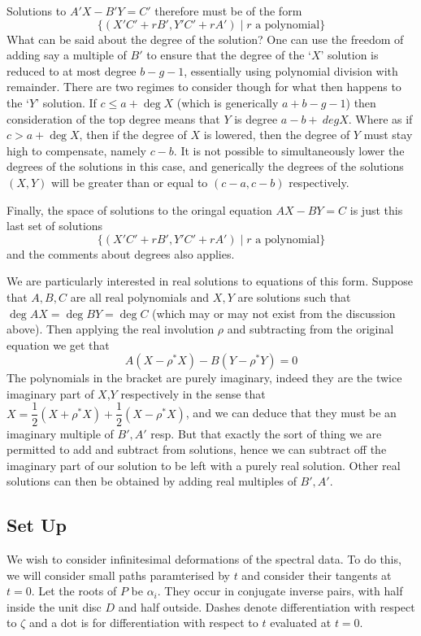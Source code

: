 Solutions to $A'X - B'Y = C'$ therefore must be of the form
\[
\{(X'C' + rB', Y'C' + rA') \mid r \text{ a polynomial} \}
\]
What can be said about the degree of the solution? One can use the freedom of adding say a multiple of $B'$ to ensure that the degree of the `$X$' solution is reduced to at most degree $b-g-1$, essentially using polynomial division with remainder. There are two regimes to consider though for what then happens to the `$Y$' solution. If $c \leq a + \deg X$ (which is generically $a+b-g-1$) then consideration of the top degree means that $Y$ is degree $a-b +\ deg X$. Where as if $c > a + \deg X$, then if the degree of $X$ is lowered, then the degree of $Y$ must stay high to compensate, namely $c-b$. It is not possible to simultaneously lower the degrees of the solutions in this case, and generically the degrees of the solutions $(X,Y)$ will be greater than or equal to $(c-a,c-b)$ respectively.

Finally, the space of solutions to the oringal equation $AX-BY=C$ is just this last set of solutions
\[
\{(X'C' + rB', Y'C' + rA') \mid r \text{ a polynomial} \}
\]
and the comments about degrees also applies.

We are particularly interested in real solutions to equations of this form. Suppose that $A,B,C$ are all real polynomials and $X,Y$ are solutions such that $\deg AX = \deg BY = \deg C$ (which may or may not exist from the discussion above). Then applying the real involution $ρ$ and subtracting from the original equation we get that
\[
A(X-ρ^*X) - B(Y-ρ^*Y) = 0
\]
The polynomials in the bracket are purely imaginary, indeed they are the twice imaginary part of $X$,$Y$ respectively in the sense that $X = \dfrac{1}{2}(X+ρ^*X) + \dfrac{1}{2}(X-ρ^*X)$, and we can deduce that they must be an imaginary multiple of $B',A'$ resp. But that exactly the sort of thing we are permitted to add and subtract from solutions, hence we can subtract off the imaginary part of our solution to be left with a purely real solution. Other real solutions can then be obtained by adding real multiples of $B',A'$.






















\subsection{Set Up}
We wish to consider infinitesimal deformations of the spectral data. To do this, we will consider small paths paramterised by $t$ and consider their tangents at $t=0$. Let the roots of $P$ be $\alpha_i$. They occur in conjugate inverse pairs, with half inside the unit disc $D$ and half outside. Dashes denote differentiation with respect to $\zeta$ and a dot is for differentiation with respect to $t$ evaluated at $t=0$.

